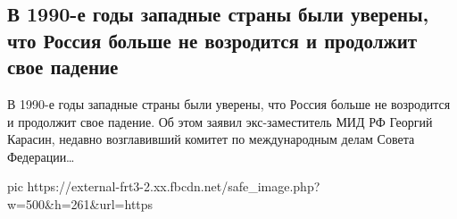  
 
 
 
 
\subsection{В 1990-е годы западные страны были уверены, что Россия больше не возродится и продолжит свое падение}

В 1990-е годы западные страны были уверены, что Россия больше не возродится и
продолжит свое падение.  Об этом заявил экс-заместитель МИД РФ Георгий Карасин,
недавно возглавивший комитет по международным делам Совета Федерации…

\ifcmt
  pic https://external-frt3-2.xx.fbcdn.net/safe_image.php?w=500&h=261&url=https%
\fi

